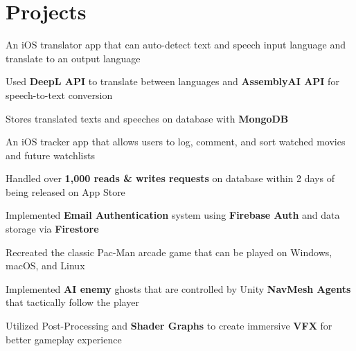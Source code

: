 \documentclass[]{main}
\begin{document}
\hfill
\begin{minipage}[t]{0.66\textwidth} 


\section{Projects}
\vspace{\topsep} %

\begin{tightemize}
     \item An iOS translator app that can auto-detect text and speech input language and translate to an output language
     \item Used \textbf{DeepL API} to translate between languages and \textbf{AssemblyAI API} for speech-to-text conversion
     \item Stores translated texts and speeches on database with \textbf{MongoDB}
\end{tightemize}

\sectionsep
{}
\begin{tightemize}
\item An iOS tracker app that allows users to log, comment, and sort watched movies and future watchlists
\item Handled over \textbf{1,000 reads \& writes requests} on database within 2 days of being released on App Store
\item Implemented \textbf{Email Authentication} system using \textbf{Firebase Auth} and data storage via \textbf{Firestore} 
\end{tightemize}
\sectionsep

\begin{tightemize}
     \item Recreated the classic Pac-Man arcade game that can be played on Windows, macOS, and Linux
        \item Implemented \textbf{AI enemy} ghosts that are controlled by Unity \textbf{NavMesh Agents} that tactically follow the player
        \item Utilized Post-Processing and \textbf{Shader Graphs} to create immersive \textbf{VFX} for better gameplay experience
\end{tightemize}
\sectionsep


\end{minipage}
\end{document}
